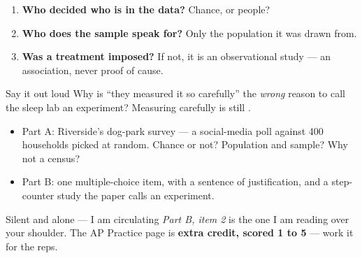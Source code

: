 \documentclass[aspectratio=169, 11pt]{beamer}
\begin{document}
\begin{frame}[t, plain]
  \vspace{6pt}
  \begin{enumerate}\setlength{\itemsep}{6pt}
    \item \textbf{Who decided who is in the data?} Chance, or people?
    \item \textbf{Who does the sample speak for?} Only the population it was drawn from.
    \item \textbf{Was a treatment imposed?} If not, it is an observational study --- an
          association, never proof of cause.
  \end{enumerate}
  \vspace{8pt}
  \begin{block}{Say it out loud}
    Why is ``they measured it so carefully'' the \emph{wrong} reason to call the sleep lab an
    experiment? \quad Measuring carefully is still .
  \end{block}
\end{frame}

\begin{frame}[t, plain]
  \begin{itemize}\setlength{\itemsep}{5pt}
    \item Part A: Riverside's dog-park survey --- a social-media poll against 400 households
          picked at random. Chance or not? Population and sample? Why not a census?
    \item Part B: one multiple-choice item, with a sentence of justification, and a step-counter
          study the paper calls an experiment.
  \end{itemize}
  \begin{block}{Silent and alone --- I am circulating}
    \emph{Part B, item 2} is the one I am reading over your shoulder. The AP Practice page is
    \textbf{extra credit, scored 1 to 5} --- work it for the reps.
  \end{block}
\end{frame}
\end{document}

